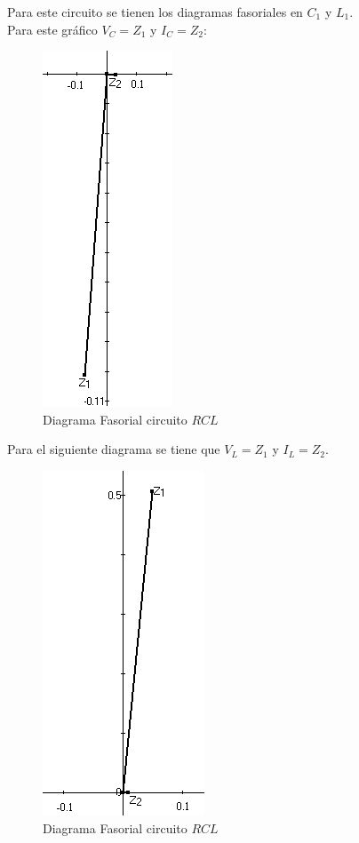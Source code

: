 \documentclass[twocolumn]{IEEEtran}
\begin{document}
\noindent
Para este circuito se tienen los diagramas fasoriales en $C_1$ y $L_1$.\\
Para este gráfico $V_C=Z_1$ y $I_C=Z_2$:
\begin{figure}[H]
	\centering
		\includegraphics[scale=0.45]{fa3.png}
	\caption{Diagrama Fasorial circuito $RCL$}
	\label{fig7}
\end{figure}
\noindent
Para el siguiente diagrama se tiene que $V_L=Z_1$ y $I_L=Z_2$.
\begin{figure}[H]
	\centering
		\includegraphics[scale=0.45]{fa4.png}
	\caption{Diagrama Fasorial circuito $RCL$}
	\label{fig8}
\end{figure}
\end{document}
